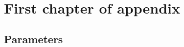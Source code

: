 
\chapter{First chapter of appendix}
\label{chap:Appendix:A}

\section{Parameters}
\label{sec:Appendix:Parameter}
